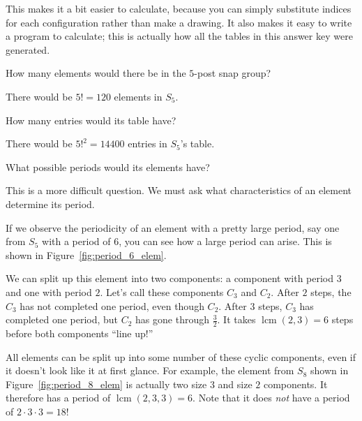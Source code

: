 \documentclass[../gatm_answers.tex]{subfiles}
\begin{document}
This makes it a bit easier to calculate, because you can simply substitute indices for each configuration rather than make a drawing. It also makes it easy to write a program to calculate; this is actually how all the tables in this answer key were generated.

\begin{outer_problem}
	\item 
\end{outer_problem}

\begin{inner_problem}[start=1]
	 \item How many elements would there be in the $5$-post snap group? \label{prob:five_post_snap_list_start}
\end{inner_problem}

There would be $5!=120$ elements in $S_5$.

\begin{inner_problem}
	\item How many entries would its table have?
\end{inner_problem}

There would be $5!^2=14400$ entries in $S_5$'s table.

\begin{inner_problem}
	\item What possible periods would its elements have? \label{prob:five_post_snap_list_end}
\end{inner_problem}

This is a more difficult question. We must ask what characteristics of an element determine its period.

If we observe the periodicity of an element with a pretty large period, say one from $S_5$ with a period of $6$, you can see how a large period can arise. This is shown in Figure~\ref{fig:period_6_elem}.

We can split up this element into two components: a component with period $3$ and one with period $2$. Let's call these components $C_3$ and $C_2$. After $2$ steps, the $C_3$ has not completed one period, even though $C_2$. After $3$ steps, $C_3$ has completed one period, but $C_2$ has gone through $\frac{3}{2}$. It takes $\operatorname{lcm}(2,3) = 6$ steps before both components ``line up!''

All elements can be split up into some number of these cyclic components, even if it doesn't look like it at first glance. For example, the element from $S_8$ shown in Figure~\ref{fig:period_8_elem} is actually two size $3$ and size $2$ components. It therefore has a period of $\operatorname{lcm}(2,3,3)=6$. Note that it does \textit{not} have a period of $2\cdot 3\cdot 3 = 18$!
\end{document}
